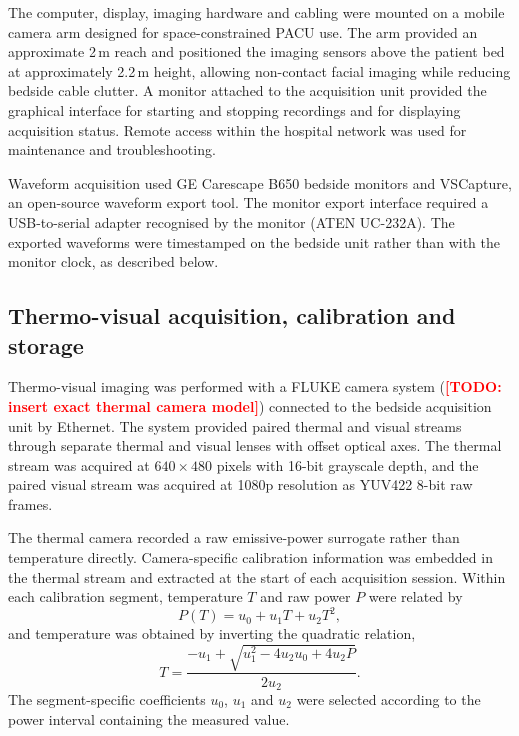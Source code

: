 \documentclass[11pt]{article}
\newcommand{\TODO}[1]{\textbf{\textcolor{red}{[TODO: #1]}}}
\begin{document}
The computer, display, imaging hardware and cabling were mounted on a mobile camera arm designed for space-constrained PACU use. The arm provided an approximate 2\,m reach and positioned the imaging sensors above the patient bed at approximately 2.2\,m height, allowing non-contact facial imaging while reducing bedside cable clutter. A monitor attached to the acquisition unit provided the graphical interface for starting and stopping recordings and for displaying acquisition status. Remote access within the hospital network was used for maintenance and troubleshooting.

Waveform acquisition used GE Carescape B650 bedside monitors and VSCapture, an open-source waveform export tool. The monitor export interface required a USB-to-serial adapter recognised by the monitor (ATEN UC-232A). The exported waveforms were timestamped on the bedside unit rather than with the monitor clock, as described below.

\subsection*{Thermo-visual acquisition, calibration and storage}

Thermo-visual imaging was performed with a FLUKE camera system (\TODO{insert exact thermal camera model}) connected to the bedside acquisition unit by Ethernet. The system provided paired thermal and visual streams through separate thermal and visual lenses with offset optical axes. The thermal stream was acquired at $640\times480$ pixels with 16-bit grayscale depth, and the paired visual stream was acquired at 1080p resolution as YUV422 8-bit raw frames.

The thermal camera recorded a raw emissive-power surrogate rather than temperature directly. Camera-specific calibration information was embedded in the thermal stream and extracted at the start of each acquisition session. Within each calibration segment, temperature $T$ and raw power $P$ were related by
\[
  P(T) = u_0 + u_1T + u_2T^2,
\]
and temperature was obtained by inverting the quadratic relation,
\[
  T = \frac{-u_1 + \sqrt{u_1^2 - 4u_2u_0 + 4u_2P}}{2u_2}.
\]
The segment-specific coefficients $u_0$, $u_1$ and $u_2$ were selected according to the power interval containing the measured value.
\end{document}
